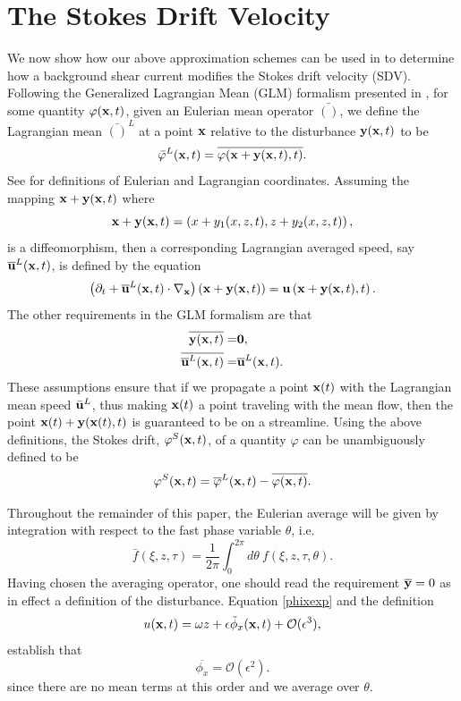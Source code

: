 \documentclass{JFM_Style/jfm}
\newcommand{\pd}{\partial}
\begin{document}
\section{The Stokes Drift Velocity}
We now show how our above approximation schemes can be used in to determine how a background shear current modifies the Stokes drift velocity (SDV).  Following the Generalized Lagrangian Mean (GLM) formalism presented in \cite{andrews}, for some quantity $\varphi({\bf x},t)$, given an
Eulerian mean operator $\bar{()}$, we define the Lagrangian mean $\bar{()}^{L}$ at a point ${\bf x}$ relative to the disturbance ${\bf y}({\bf x},t)$ to be  
\[
\bar{\varphi}^{L}({\bf x},t) = \overline{\varphi({\bf x}+{\bf y}({\bf x},t),t)}.
\]
See \cite{kundu} for definitions of Eulerian and Lagrangian coordinates.  Assuming the mapping ${\bf x} + {\bf y}({\bf x},t)$ where
\[
{\bf x} + {\bf y}({\bf x},t) = \left(x+y_{1}(x,z,t),z+y_{2}(x,z,t)\right),
\]
is a diffeomorphism, then a corresponding Lagrangian averaged speed, say $\overline{{\bf u}}^{L}({\bf x},t)$, is defined by the equation
\begin{equation}
\left(\pd_{t} + \overline{{\bf u}}^{L}({\bf x},t)\cdot \nabla_{{\bf x}} \right) \left({\bf x} + {\bf y}({\bf x},t)\right) = {\bf u}\left({\bf x} + {\bf y}({\bf x},t),t\right).
\label{speeddef}
\end{equation}
The other requirements in the GLM formalism are that 
\begin{align*}
\overline{{\bf y}({\bf x},t)} = & \bf{0}, \\
\overline{\overline{{\bf u}}^{L}({\bf x},t)} = & \overline{{\bf u}}^{L}({\bf x},t).
\end{align*}
These assumptions ensure that if we propagate a point ${\bf x}(t)$ with the Lagrangian mean speed $\bar{{\bf u}}^{L}$, thus making ${\bf x}(t)$ a point traveling with the mean flow, then the point ${\bf x}(t) + {\bf y}({\bf x}(t),t)$ is guaranteed to be on a streamline.  Using the above definitions, the Stokes drift, $\varphi^{S}({\bf x},t)$, of a quantity $\varphi$ can be unambiguously defined to be 
\[
\varphi^{S}({\bf x},t) = \overline{\varphi}^{L}({\bf x},t) - \overline{\varphi({\bf x},t)}. 
\]

Throughout the remainder of this paper, the Eulerian average will be given by integration with respect to the fast phase variable $\theta$, i.e.  
\[
\bar{f}(\xi,z,\tau) = \frac{1}{2\pi}\int_{0}^{2\pi} d\theta~ f(\xi,z,\tau,\theta).
\]
Having chosen the averaging operator, one should read the requirement $\overline{{\bf y}}=0$ as in effect a definition of the disturbance.  Equation \eqref{phixexp} and the definition
\[
u({\bf x},t) = \omega z + \epsilon \tilde{\phi}_{x}({\bf x},t) + \mathcal{O}(\epsilon^{3}), 
\]
establish that 
\[
\overline{\phi_{x}}= \mathcal{O}(\epsilon^{2}). 
\]
since there are no mean terms at this order and we average over $\theta$.
\end{document}
